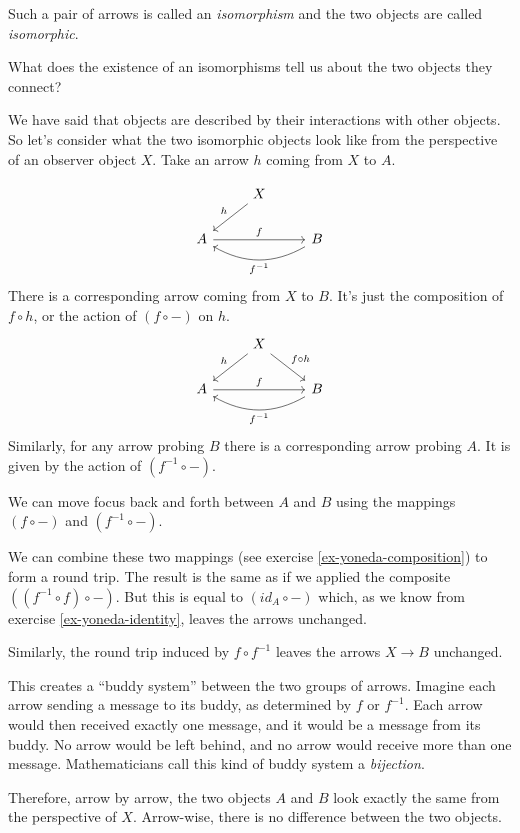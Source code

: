 \documentclass[DaoFP]{subfiles}
\begin{document}
Such a pair of arrows is called an \emph{isomorphism} and the two objects are called \emph{isomorphic}.

What does the existence of an isomorphisms tell us about the two objects they connect? 

We have said that objects are described by their interactions with other objects. So let's consider what the two isomorphic objects look like from the perspective of an observer object $X$. Take an arrow $h$ coming from $X$ to $A$.

\[
 \begin{tikzcd}
 & X
 \arrow[ld, "h"']
 \\
 A
 \arrow[rr, "f"]
  && B
 \arrow[ll, bend left,  "f^{-1}"]
 \end{tikzcd}
\]
There is a corresponding arrow coming from $X$ to $B$. It's just the composition of $f \circ h$, or the action of $(f \circ -)$ on $h$.
\[
 \begin{tikzcd}
 & X
 \arrow[ld, "h"']
 \arrow[rd, "f \circ h"]
 \\
 A
 \arrow[rr, "f"]
  && B
 \arrow[ll, bend left,  "f^{-1}"]
 \end{tikzcd}
\]
Similarly, for any arrow probing $B$ there is a corresponding arrow probing $A$. It is given by the action of  $(f^{-1} \circ -)$. 

We can move focus back and forth between $A$ and $B$ using the mappings $(f \circ -)$ and $(f^{-1} \circ -)$.

We can combine these two mappings (see exercise \ref{ex-yoneda-composition}) to form a round trip. The result is the same as if we applied the composite $((f^{-1} \circ f) \circ -)$. But this is equal to $(id_A \circ  -)$ which, as we know from exercise \ref{ex-yoneda-identity}, leaves the arrows unchanged.

Similarly, the round trip induced by $f \circ f^{-1}$ leaves the arrows $X \to B$ unchanged. 

This creates a ``buddy system'' between the two groups of arrows. Imagine each arrow sending a message to its buddy, as determined by $f$ or $f^{-1}$. Each arrow would then received exactly one message, and it would be a message from its buddy. No arrow would be left behind, and no arrow would receive more than one message. Mathematicians call this kind of buddy system a \emph{bijection}.

Therefore, arrow by arrow, the two objects $A$ and $B$ look exactly the same from the perspective of $X$. Arrow-wise, there is no difference between the two objects. 
\end{document}

